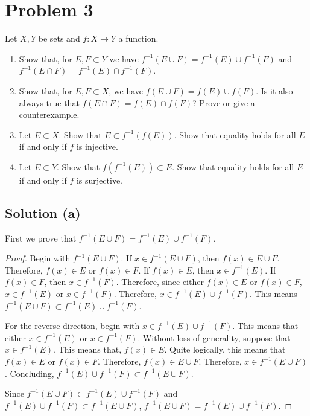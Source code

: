 \documentclass[11pt]{article}
\begin{document}
\section{Problem 3}
    Let $X, Y$ be sets and $f : X \to Y$ a function.
    \begin{enumerate}[label=(\alph*)]
        \item 
        Show that, for $E, F \subset Y$ we have $f^{-1}(E \cup F) = f^{-1}(E) \cup f^{-1}(F)$ and $f^{-1}(E \cap F) = f^{-1}(E) \cap f^{-1}(F)$.

        \item 
        Show that, for $E, F \subset X$, we have $f(E \cup F) = f(E) \cup f(F)$. Is it also always true that $f(E \cap F) = f(E) \cap f(F)$? Prove or give a counterexample.

        \item 
        Let $E \subset X$. Show that $E \subset f^{-1}(f(E))$. Show that equality holds for all $E$ if and only if $f$ is injective.

        \item 
        Let $E \subset Y$. Show that $f(f^{-1}(E)) \subset E$. Show that equality holds for all $E$ if and only if $f$ is surjective.
        
    \end{enumerate}

    \subsection{Solution (a)}
        First we prove that $f^{-1}(E \cup F) = f^{-1}(E) \cup f^{-1}(F)$.
        \begin{proof}
            Begin with $f^{-1}(E \cup F)$.
            If $x \in f^{-1}(E \cup F)$, then $f(x) \in E \cup F$.
            Therefore, $f(x) \in E$ or $f(x) \in F$.
            If $f(x) \in E$, then $x \in f^{-1}(E)$.
            If $f(x) \in F$, then $x \in f^{-1}(F)$.
            Therefore, since either $f(x) \in E$ or $f(x) \in F$, $x \in f^{-1}(E)$ or $x \in f^{-1}(F)$.
            Therefore, $x \in f^{-1}(E) \cup f^{-1}(F)$.
            This means $f^{-1}(E \cup F) \subset f^{-1}(E) \cup f^{-1}(F)$.

            For the reverse direction, begin with $x \in f^{-1}(E) \cup f^{-1}(F)$.
            This means that either $x \in f^{-1}(E)$ or $x \in f^{-1}(F)$.
            Without loss of generality, suppose that $x \in f^{-1}(E)$.
            This means that, $f(x) \in E$.
            Quite logically, this means that $f(x) \in E$ or $f(x) \in F$.
            Therefore, $f(x) \in E \cup F$.
            Therefore, $x \in f^{-1}(E \cup F)$.
            Concluding, $f^{-1}(E) \cup f^{-1}(F) \subset f^{-1}(E \cup F)$.

            Since $f^{-1}(E \cup F) \subset f^{-1}(E) \cup f^{-1}(F)$ and $f^{-1}(E) \cup f^{-1}(F) \subset f^{-1}(E \cup F)$, $f^{-1}(E \cup F) = f^{-1}(E) \cup f^{-1}(F)$.
        \end{proof}
\end{document}

